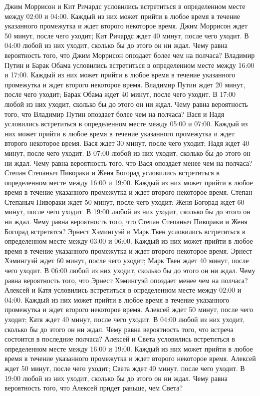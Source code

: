 Джим Моррисон и Кит Ричардс условились встретиться в определенном месте между 02:00 и 04:00. Каждый из них может прийти в любое время в течение указанного промежутка и ждет второго некоторое время. Джим Моррисон ждет 50 минут, после чего уходит; Кит Ричардс ждет 40 минут, после чего уходит. В 04:00 любой из них уходит, сколько бы до этого он ни ждал. Чему равна вероятность того, что Джим Моррисон опоздает более чем на полчаса?
Владимир Путин и Барак Обама условились встретиться в определенном месте между 16:00 и 17:00. Каждый из них может прийти в любое время в течение указанного промежутка и ждет второго некоторое время. Владимир Путин ждет 20 минут, после чего уходит; Барак Обама ждет 40 минут, после чего уходит. В 17:00 любой из них уходит, сколько бы до этого он ни ждал. Чему равна вероятность того, что Владимир Путин опоздает более чем на полчаса?
Вася и Надя условились встретиться в определенном месте между 05:00 и 07:00. Каждый из них может прийти в любое время в течение указанного промежутка и ждет второго некоторое время. Вася ждет 30 минут, после чего уходит; Надя ждет 40 минут, после чего уходит. В 07:00 любой из них уходит, сколько бы до этого он ни ждал. Чему равна вероятность того, что Вася опоздает менее чем на полчаса?
Степан Степаныч Пивораки и Женя Богорад условились встретиться в определенном месте между 16:00 и 19:00. Каждый из них может прийти в любое время в течение указанного промежутка и ждет второго некоторое время. Степан Степаныч Пивораки ждет 50 минут, после чего уходит; Женя Богорад ждет 60 минут, после чего уходит. В 19:00 любой из них уходит, сколько бы до этого он ни ждал. Чему равна вероятность того, что Степан Степаныч Пивораки и Женя Богорад встретятся?
Эрнест Хэмингуэй и Марк Твен условились встретиться в определенном месте между 03:00 и 06:00. Каждый из них может прийти в любое время в течение указанного промежутка и ждет второго некоторое время. Эрнест Хэмингуэй ждет 60 минут, после чего уходит; Марк Твен ждет 40 минут, после чего уходит. В 06:00 любой из них уходит, сколько бы до этого он ни ждал. Чему равна вероятность того, что Эрнест Хэмингуэй опоздает менее чем на полчаса?
Алексей и Катя условились встретиться в определенном месте между 02:00 и 04:00. Каждый из них может прийти в любое время в течение указанного промежутка и ждет второго некоторое время. Алексей ждет 50 минут, после чего уходит; Катя ждет 40 минут, после чего уходит. В 04:00 любой из них уходит, сколько бы до этого он ни ждал. Чему равна вероятность того, что встреча состоится в последние полчаса?
Алексей и Света условились встретиться в определенном месте между 16:00 и 19:00. Каждый из них может прийти в любое время в течение указанного промежутка и ждет второго некоторое время. Алексей ждет 50 минут, после чего уходит; Света ждет 40 минут, после чего уходит. В 19:00 любой из них уходит, сколько бы до этого он ни ждал. Чему равна вероятность того, что Алексей придет раньше, чем Света?
